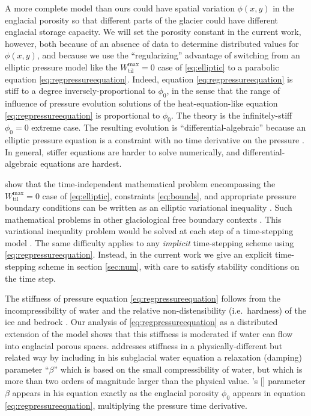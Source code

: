 \documentclass[11pt,final]{amsart}
\newcommand{\Wtilmax}{W_{\text{til}}^{\text{max}}}
\newcommand{\citeapos}[1]{\citeauthor{#1}'s [\citeyear{#1}]}
\begin{document}
A more complete model than ours could have spatial variation $\phi(x,y)$ in the englacial porosity so that different parts of the glacier could have different englacial storage capacity.  We will set the porosity constant in the current work, however, both because of an absence of data to determine distributed values for $\phi(x,y)$, and because we use the ``regularizing'' advantage of switching from an elliptic pressure model like the $\Wtilmax=0$ case of \eqref{eq:elliptic} to a parabolic equation \eqref{eq:regpressureequation}.  Indeed, equation \eqref{eq:regpressureequation} is stiff to a degree inversely-proportional to $\phi_0$, in the sense that the range of influence of pressure evolution solutions of the heat-equation-like equation \eqref{eq:regpressureequation} is proportional to $\phi_0$.  The \cite{Schoofetal2012} theory is the infinitely-stiff $\phi_0=0$ extreme case.  The resulting evolution is ``differential-algebraic'' because an elliptic pressure equation is a constraint with no time derivative on the pressure \citep{AscherPetzold}.  In general, stiffer equations are harder to solve numerically, and differential-algebraic equations are hardest.

\cite{Schoofetal2012} show that the time-independent mathematical problem encompassing the $\Wtilmax=0$ case of \eqref{eq:elliptic}, constraints \eqref{eq:bounds}, and appropriate pressure boundary conditions can be written as an elliptic variational inequality \citep{KinderlehrerStampacchia}.  Such mathematical problems in other glaciological free boundary contexts \citep{SchoofStream,JouvetBueler2012}.  This variational inequality problem would be solved at each step of a time-stepping model \citep{Hewitt2013}.  The same difficulty applies to any \emph{implicit} time-stepping scheme using \eqref{eq:regpressureequation}.  Instead, in the current work we give an explicit time-stepping scheme in section \ref{sec:num}, with care to satisfy stability conditions on the time step.

The stiffness of pressure equation \eqref{eq:regpressureequation} follows from the incompressibility of water and the relative non-distensibility (i.e.~hardness) of the ice and bedrock \citep{Clarke2003}.  Our analysis of \eqref{eq:regpressureequation} as a distributed extension of the \cite{Bartholomausetal2011} model shows that this stiffness is moderated if water can flow into englacial porous spaces.  \cite{Clarke2003} addresses stiffness in a physically-different but related way by including in his subglacial water equation a relaxation (damping) parameter  ``$\beta$'' which is based on the small compressibility of water, but which is more than two orders of magnitude larger than the physical value.  \citeapos{Clarke2003} parameter $\beta$ appears in his equation exactly as the englacial porosity $\phi_0$ appears in equation \eqref{eq:regpressureequation}, multiplying the pressure time derivative.
  
\end{document}
